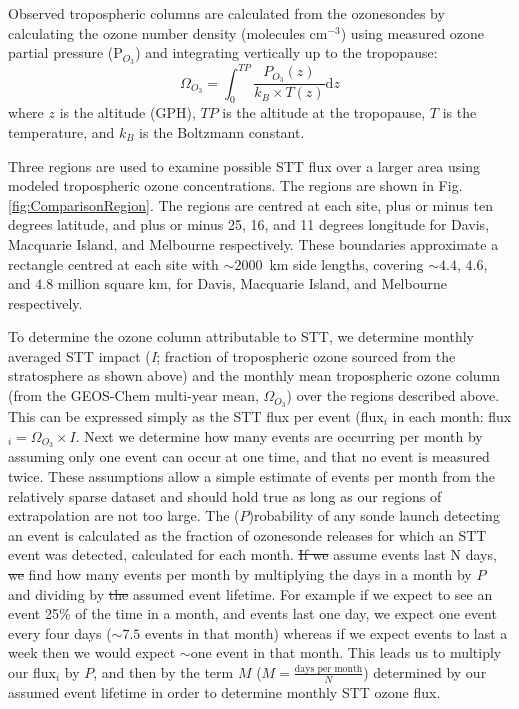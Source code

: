 \documentclass[acp, manuscript]{copernicus} %
\providecommand{\DIFadd}[1]{{\protect\color{blue}\uwave{#1}}} %
\providecommand{\DIFdel}[1]{{\protect\color{red}\sout{#1}}}                      %
\providecommand{\DIFaddbegin}{} %
\providecommand{\DIFaddend}{} %
\providecommand{\DIFdelbegin}{} %
\providecommand{\DIFdelend}{} %
\begin{document}
    Observed tropospheric columns are calculated from the ozonesondes by calculating the ozone number density (molecules cm$^{-3}$) using measured ozone partial pressure (P$_{O_3}$) and integrating vertically up to the tropopause:
    \begin{equation*} \Omega_{O_3} = \int_{0}^{TP} \frac{P_{O_3}(z)}{k_B \times T(z)} \mathrm{d}z \end{equation*}
    where $z$ is the altitude (GPH), $TP$ is the altitude at the tropopause, $T$ is the temperature, and $k_B$ is the Boltzmann constant.

    Three regions are used to examine possible STT flux over a larger area using modeled tropospheric ozone concentrations.
    The regions are shown in Fig. \ref{fig:ComparisonRegion}.
    The regions are centred at each site, plus or minus ten degrees latitude, and plus or minus 25, 16, and 11 degrees longitude for Davis, Macquarie Island, and Melbourne respectively.
    These boundaries approximate a rectangle centred at each site with $\sim 2000$~km side lengths, covering $\sim 4.4$, $4.6$, and $4.8$ million square km, for Davis, Macquarie Island, and Melbourne respectively.

    To determine the ozone column attributable to STT, we determine monthly averaged STT impact (\textit{I}; fraction of tropospheric ozone sourced from the stratosphere as shown above) and the monthly mean tropospheric ozone column (from the GEOS-Chem multi-year mean, $\Omega_{O_3}$) over the regions described above.
    This can be expressed simply as the STT flux per event (flux$_i$ in each month: flux$_i = \Omega_{O_3} \times I$\DIFaddbegin \DIFadd{)}\DIFaddend .
    Next we determine how many events are occurring per month by assuming only one event can occur at one time, and that no event is measured twice.
    These assumptions allow a simple estimate of events per month from the relatively sparse dataset and should hold true as long as our regions of extrapolation are not too large.
    The ($P$)robability of any sonde launch detecting an event is calculated as the fraction of ozonesonde releases for which an STT event was detected, calculated for each month.
    \DIFdelbegin \DIFdel{If we }\DIFdelend \DIFaddbegin \DIFadd{We }\DIFaddend assume events last N days, \DIFdelbegin \DIFdel{we }\DIFdelend \DIFaddbegin \DIFadd{then }\DIFaddend find how many events per month \DIFaddbegin \DIFadd{we expect }\DIFaddend by multiplying the days in a month by $P$ and dividing by \DIFdelbegin \DIFdel{the }\DIFdelend \DIFaddbegin \DIFadd{this }\DIFaddend assumed event lifetime.
    For example if we expect to see an event 25\% of the time in a month, and events last one day, we expect one event every four days ($\sim 7.5$ events in that month) whereas if we expect events to last a week then we would expect $\sim$one event in that month.
    This leads us to multiply our flux$_i$ by $P$, and then by the term $M$ ($M= \frac{\text{days per month}}{N}$) determined by our assumed event lifetime in order to determine monthly STT ozone flux.
\end{document}
